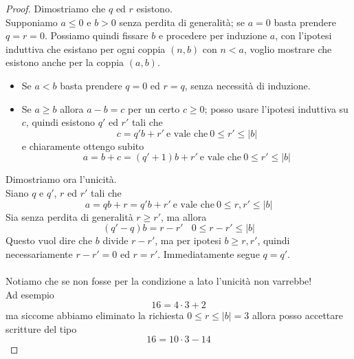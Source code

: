 \begin{proof}
	Dimostriamo che $q$ ed $r$ esistono. \\ Supponiamo $a \leq 0$ e $b>0$ senza perdita di generalità; se $a=0$ basta prendere $q=r=0$. Possiamo quindi fissare $b$ e procedere per induzione $a$, con l'ipotesi induttiva che esistano per ogni coppia $(n,b)$ con $n<a$, voglio mostrare che esistono anche per la coppia $(a,b)$.
	\begin{itemize}
		\item Se $a<b$ basta prendere $q=0$ ed $r=q$, senza necessità di induzione.
		\item Se $a\geq b$ allora $a-b=c$ per un certo $c\geq 0$; posso usare l'ipotesi induttiva su $c$, quindi esistono $q'$ ed $r'$ tali che 
		\begin{equation*}
		c = q'b + r' \ \text{e vale che} \ 0 \leq r' \leq |b|
		\end{equation*}
		e chiaramente ottengo subito
		\begin{equation*}
		a = b+c = (q'+1)b + r' \ \text{e vale che} \ 0 \leq r' \leq |b|
		\end{equation*}
	\end{itemize}
Dimostriamo ora l'unicità. \\
Siano $q$ e $q'$, $r$ ed $r'$ tali che 
\begin{equation*}
a = qb + r= q'b + r'\ \text{e vale che} \ 0 \leq r,r' \leq |b|
\end{equation*}
Sia senza perdita di generalità $r \geq r'$, ma allora
\begin{equation*}
(q'-q)b=r-r' \ \ \ \ 0 \leq r-r' \leq |b|
\end{equation*}
Questo vuol dire che $b$ divide $r-r'$, ma per ipotesi $b\geq r,r'$,
quindi necessariamente $r-r'=0$ ed $r=r'$. Immediatamente segue $q=q'$. \\ \\ Notiamo che se non fosse per la condizione a lato l'unicità non varrebbe! \\ Ad esempio 
\begin{equation*}
16 = 4\cdot3+2
\end{equation*}
ma siccome abbiamo eliminato la richiesta $0\leq r \leq |b|=3$ allora posso accettare scritture del tipo
\begin{equation*}
16=10\cdot3-14
\end{equation*}
\end{proof}

